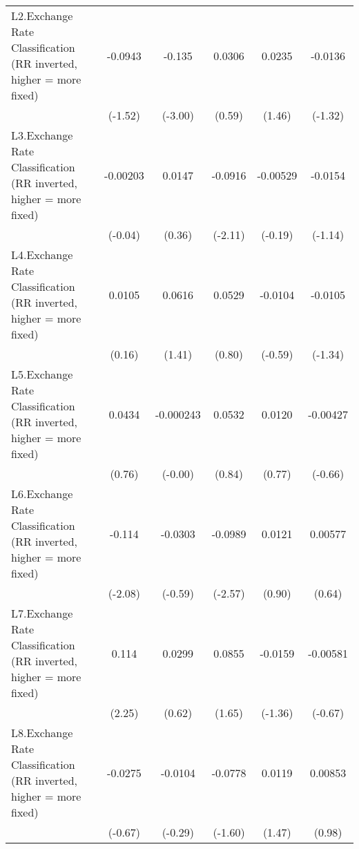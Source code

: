 {\begin{tabular*}{\linewidth}{@{\hskip\tabcolsep\extracolsep\fill}l*{5}{c}}
\addlinespace
L2.Exchange Rate Classification (RR inverted, higher = more fixed)&  -0.0943         &   -0.135\sym{**} &   0.0306         &   0.0235         &  -0.0136         \\
                &  (-1.52)         &  (-3.00)         &   (0.59)         &   (1.46)         &  (-1.32)         \\
\addlinespace
L3.Exchange Rate Classification (RR inverted, higher = more fixed)& -0.00203         &   0.0147         &  -0.0916\sym{*}  & -0.00529         &  -0.0154         \\
                &  (-0.04)         &   (0.36)         &  (-2.11)         &  (-0.19)         &  (-1.14)         \\
\addlinespace
L4.Exchange Rate Classification (RR inverted, higher = more fixed)&   0.0105         &   0.0616         &   0.0529         &  -0.0104         &  -0.0105         \\
                &   (0.16)         &   (1.41)         &   (0.80)         &  (-0.59)         &  (-1.34)         \\
\addlinespace
L5.Exchange Rate Classification (RR inverted, higher = more fixed)&   0.0434         &-0.000243         &   0.0532         &   0.0120         & -0.00427         \\
                &   (0.76)         &  (-0.00)         &   (0.84)         &   (0.77)         &  (-0.66)         \\
\addlinespace
L6.Exchange Rate Classification (RR inverted, higher = more fixed)&   -0.114\sym{*}  &  -0.0303         &  -0.0989\sym{*}  &   0.0121         &  0.00577         \\
                &  (-2.08)         &  (-0.59)         &  (-2.57)         &   (0.90)         &   (0.64)         \\
\addlinespace
L7.Exchange Rate Classification (RR inverted, higher = more fixed)&    0.114\sym{*}  &   0.0299         &   0.0855         &  -0.0159         & -0.00581         \\
                &   (2.25)         &   (0.62)         &   (1.65)         &  (-1.36)         &  (-0.67)         \\
\addlinespace
L8.Exchange Rate Classification (RR inverted, higher = more fixed)&  -0.0275         &  -0.0104         &  -0.0778         &   0.0119         &  0.00853         \\
                &  (-0.67)         &  (-0.29)         &  (-1.60)         &   (1.47)         &   (0.98)         \\

\end{tabular*}}
